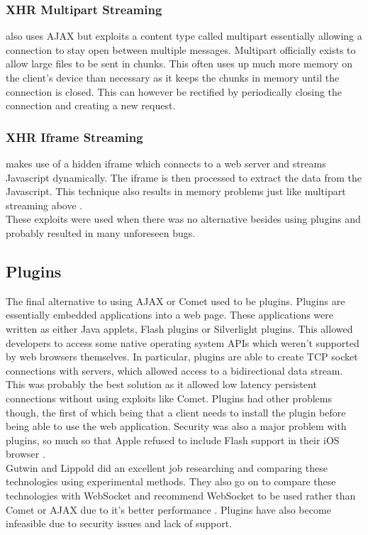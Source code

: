 \documentclass[prodmode,acmtecs]{acmsmall}
\begin{document}
\subsubsection{XHR Multipart Streaming} also uses AJAX but exploits a content type called multipart essentially allowing a connection to stay open between multiple messages. Multipart officially exists to allow large files to be sent in chunks. This often uses up much more memory on the client's device than necessary as it keeps the chunks in memory until the connection is closed. This can however be rectified by periodically closing the connection and creating a new request.
\subsubsection{XHR Iframe Streaming} makes use of a hidden iframe which connects to a web server and streams Javascript dynamically. The iframe is then processed to extract the data from the Javascript. This technique also results in memory problems just like multipart streaming above \cite{gutwin2011real}.\\

These exploits were used when there was no alternative besides using plugins and probably resulted in many unforeseen bugs.

\subsection{Plugins}
The final alternative to using AJAX or Comet used to be plugins. Plugins are essentially embedded applications into a web page. These applications were written as either Java applets, Flash plugins or Silverlight plugins. This allowed developers to access some native operating system APIs which weren't supported by web browsers themselves. In particular, plugins are able to create TCP socket connections with servers, which allowed access to a bidirectional data stream. This was probably the best solution as it allowed low latency persistent connections without using exploits like Comet. Plugins had other problems though, the first of which being that a client needs to install the plugin before being able to use the web application. Security was also a major problem with plugins, so much so that Apple refused to include Flash support in their iOS browser \cite{gutwin2011real}.\\

Gutwin and Lippold did an excellent job researching and comparing these technologies using experimental methods. They also go on to compare these technologies with WebSocket and recommend WebSocket to be used rather than Comet or AJAX due to it's better performance \cite{gutwin2011real}. Plugins have also become infeasible due to security issues and lack of support. \cite{wenzel2013towards}
\end{document}
